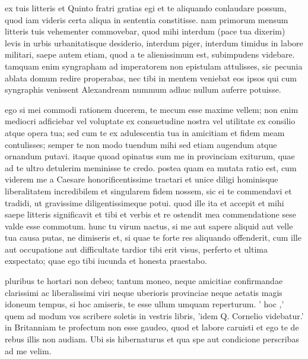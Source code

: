 


 ex tuis litteris et Quinto fratri gratias egi et te aliquando conlaudare possum, quod iam videris certa aliqua in sententia constitisse. nam primorum mensum litteris tuis vehementer commovebar, quod mihi interdum (pace tua dixerim) levis in urbis urbanitatisque desiderio, interdum piger, interdum timidus in labore militari, saepe autem etiam, quod a te alienissimum est, subimpudens videbare. tamquam enim syngrapham ad imperatorem non epistulam attulisses, sic pecunia ablata domum redire properabas, nec tibi in mentem veniebat eos ipsos qui cum syngraphis venissent Alexandream nummum adhuc nullum auferre potuisse.

 ego si mei commodi rationem ducerem, te mecum esse maxime vellem; non enim mediocri adficiebar vel voluptate ex consuetudine nostra vel utilitate ex consilio atque opera tua; sed cum te ex adulescentia tua in amicitiam et fidem meam contulisses; semper te non modo tuendum mihi sed etiam augendum atque ornandum putavi. itaque quoad opinatus sum me in provinciam exiturum, quae ad te ultro detulerim meminisse te credo. postea quam ea mutata ratio est, cum viderem me a Caesare honorificentissime tractari et unice diligi hominisque liberalitatem incredibilem et singularem fidem nossem, sic ei te commendavi et tradidi, ut gravissime diligentissimeque potui. quod ille ita et accepit et mihi saepe litteris significavit et tibi et verbis et re ostendit mea commendatione sese valde esse commotum. hunc tu virum nactus, si me aut sapere aliquid aut velle tua causa putas, ne dimiseris et, si quae te forte res aliquando offenderit, cum ille aut occupatione aut difficultate tardior tibi erit visus, perferto et ultima exspectato; quae ego tibi iucunda et honesta praestabo.

 pluribus te hortari non debeo; tantum moneo, neque amicitiae confirmandae clarissimi ac liberalissimi viri neque uberioris provinciae neque aetatis magis idoneum tempus, si hoc amiseris, te esse ullum umquam reperturum. ' hoc ,' quem ad modum vos scribere soletis in vestris libris, 'idem Q. Cornelio videbatur.' in Britanniam te profectum non esse gaudeo, quod et labore caruisti et ego te de rebus illis non audiam. Ubi sis hibernaturus et qua spe aut condicione perscribas ad me velim.
